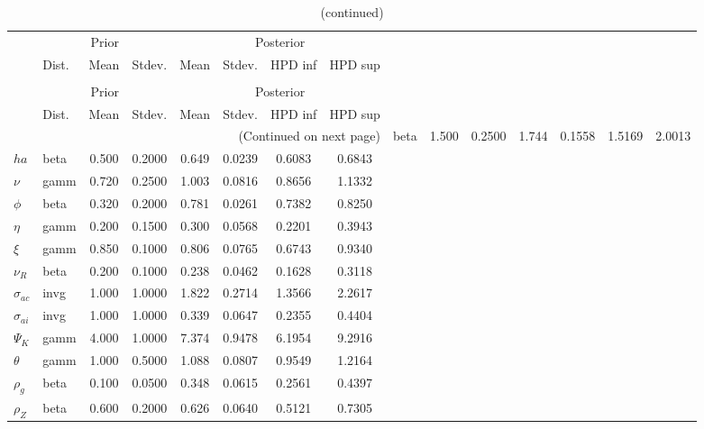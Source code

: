  
\begin{center}
\begin{longtable}{llcccccc} 
\caption{Results from Metropolis-Hastings (parameters)}
 \label{Table:MHPosterior:1}\\
\toprule 
  & \multicolumn{3}{c}{Prior}  &  \multicolumn{4}{c}{Posterior} \\
  \cmidrule(r{.75em}){2-4} \cmidrule(r{.75em}){5-8}
  & Dist. & Mean  & Stdev. & Mean & Stdev. & HPD inf & HPD sup\\
\midrule \endfirsthead 
\caption{(continued)}\\\toprule 
  & \multicolumn{3}{c}{Prior}  &  \multicolumn{4}{c}{Posterior} \\
  \cmidrule(r{.75em}){2-4} \cmidrule(r{.75em}){5-8}
  & Dist. & Mean  & Stdev. & Mean & Stdev. & HPD inf & HPD sup\\
\midrule \endhead 
\bottomrule \multicolumn{8}{r}{(Continued on next page)} \endfoot 
\bottomrule \endlastfoot 
${\sigma}$ & beta &   1.500 & 0.2500 &   1.744& 0.1558 &  1.5169 &  2.0013 \\ 
${ha}$ & beta &   0.500 & 0.2000 &   0.649& 0.0239 &  0.6083 &  0.6843 \\ 
$\nu$ & gamm &   0.720 & 0.2500 &   1.003& 0.0816 &  0.8656 &  1.1332 \\ 
${\phi}$ & beta &   0.320 & 0.2000 &   0.781& 0.0261 &  0.7382 &  0.8250 \\ 
${\eta}$ & gamm &   0.200 & 0.1500 &   0.300& 0.0568 &  0.2201 &  0.3943 \\ 
$\xi$ & gamm &   0.850 & 0.1000 &   0.806& 0.0765 &  0.6743 &  0.9340 \\ 
${\nu_R}$ & beta &   0.200 & 0.1000 &   0.238& 0.0462 &  0.1628 &  0.3118 \\ 
${\sigma_{ac}}$ & invg &   1.000 & 1.0000 &   1.822& 0.2714 &  1.3566 &  2.2617 \\ 
${\sigma_{ai}}$ & invg &   1.000 & 1.0000 &   0.339& 0.0647 &  0.2355 &  0.4404 \\ 
${\Psi_{K}}$ & gamm &   4.000 & 1.0000 &   7.374& 0.9478 &  6.1954 &  9.2916 \\ 
${\theta}$ & gamm &   1.000 & 0.5000 &   1.088& 0.0807 &  0.9549 &  1.2164 \\ 
${\rho_g}$ & beta &   0.100 & 0.0500 &   0.348& 0.0615 &  0.2561 &  0.4397 \\ 
${\rho_Z}$ & beta &   0.600 & 0.2000 &   0.626& 0.0640 &  0.5121 &  0.7305 \\ 

\end{longtable}
\end{center}
